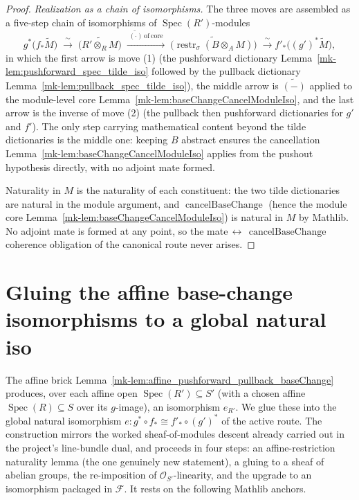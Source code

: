 \begin{proof}
  \medskip
  \emph{Realization as a chain of isomorphisms.} The three moves are assembled as a
  five-step chain of isomorphisms of \(\operatorname{Spec}(R')\)-modules
  \[
    g^*\bigl(f_*\widetilde{M}\bigr)
    \;\xrightarrow{\;\sim\;}\; \widetilde{\bigl(R' \otimes_R M\bigr)}
    \;\xrightarrow{\;\widetilde{(\cdot)}\,\mathrm{of\ core}\;}\;
    \widetilde{\bigl(\operatorname{restr}_\sigma(B \otimes_A M)\bigr)}
    \;\xrightarrow{\;\sim\;} f'_*\bigl((g')^*\widetilde{M}\bigr),
  \]
  in which the first arrow is move (1) (the pushforward dictionary
  Lemma~\ref{mk-lem:pushforward_spec_tilde_iso} followed by the pullback dictionary
  Lemma~\ref{mk-lem:pullback_spec_tilde_iso}), the middle arrow is \(\widetilde{(-)}\)
  applied to the module-level core Lemma~\ref{mk-lem:baseChangeCancelModuleIso}, and the
  last arrow is the inverse of move (2) (the pullback then pushforward dictionaries for
  \(g'\) and \(f'\)). The only step carrying mathematical content beyond the tilde
  dictionaries is the middle one: keeping \(B\) abstract ensures the cancellation
  Lemma~\ref{mk-lem:baseChangeCancelModuleIso} applies from the pushout hypothesis
  directly, with no adjoint mate formed.

  Naturality in \(M\) is the naturality of each constituent: the two tilde dictionaries
  are natural in the module argument, and \(\operatorname{cancelBaseChange}\) (hence the
  module core Lemma~\ref{mk-lem:baseChangeCancelModuleIso}) is natural in \(M\) by Mathlib.
  No adjoint mate is formed at any point, so the
  mate\(\,\leftrightarrow\,\operatorname{cancelBaseChange}\) coherence obligation of the
  canonical route never arises.
\end{proof}

\section{Gluing the affine base-change isomorphisms to a global natural iso}
\label{mk-sec:fbc_gluing}

The affine brick Lemma~\ref{mk-lem:affine_pushforward_pullback_baseChange} produces, over
each affine open \(\operatorname{Spec}(R') \subseteq S'\) (with a chosen affine
\(\operatorname{Spec}(R) \subseteq S\) over its \(g\)-image), an isomorphism
\(e_{R'}\). We glue these into the global natural isomorphism
\(e : g^* \circ f_* \cong f'_* \circ (g')^*\) of the active route. The construction
mirrors the worked sheaf-of-modules descent already carried out in the project's
line-bundle dual, and proceeds in four steps: an affine-restriction naturality lemma
(the one genuinely new statement), a gluing to a sheaf of abelian groups, the
re-imposition of \(\mathcal{O}_{S'}\)-linearity, and the upgrade to an isomorphism
packaged in \(\mathcal{F}\). It rests on the following Mathlib anchors.

